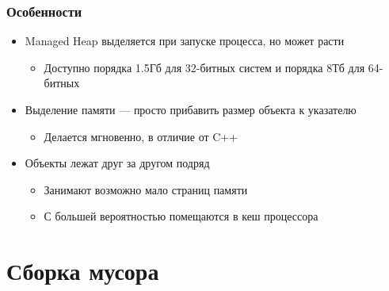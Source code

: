 \documentclass[xetex,mathserif,serif]{beamer}
\begin{document}
    \begin{frame}
        \frametitle{Особенности}
        \begin{itemize}
            \item Managed Heap выделяется при запуске процесса, но может расти
            \begin{itemize}
                \item Доступно порядка 1.5Гб для 32-битных систем и порядка 8Тб для 64-битных
            \end{itemize}
            \item Выделение памяти --- просто прибавить размер объекта к указателю
            \begin{itemize}
                \item Делается мгновенно, в отличие от C++
            \end{itemize}
            \item Объекты лежат друг за другом подряд
            \begin{itemize}
                \item Занимают возможно мало страниц памяти
                \item С большей вероятностью помещаются в кеш процессора
            \end{itemize}
        \end{itemize}
    \end{frame}

    \section{Сборка мусора}
\end{document}
